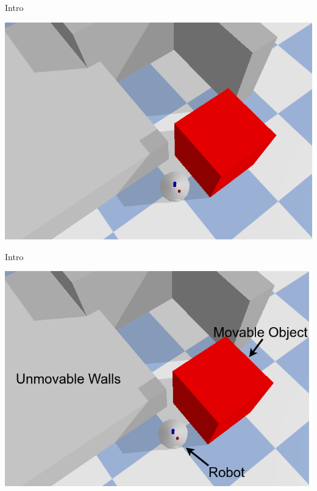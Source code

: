 \begin{frame}[fragile]{Intro}
\vspace{-0.7cm}
\begin{center}
\includegraphics[height=0.9\textheight]{figures/introduction/robot_no_target}
\end{center}
\end{frame}

\begin{frame}[fragile]{Intro}
\vspace{-0.7cm}
\begin{center}
\includegraphics[height=0.9\textheight]{figures/introduction/robot_no_target_with_arrows}
\end{center}
\end{frame}

